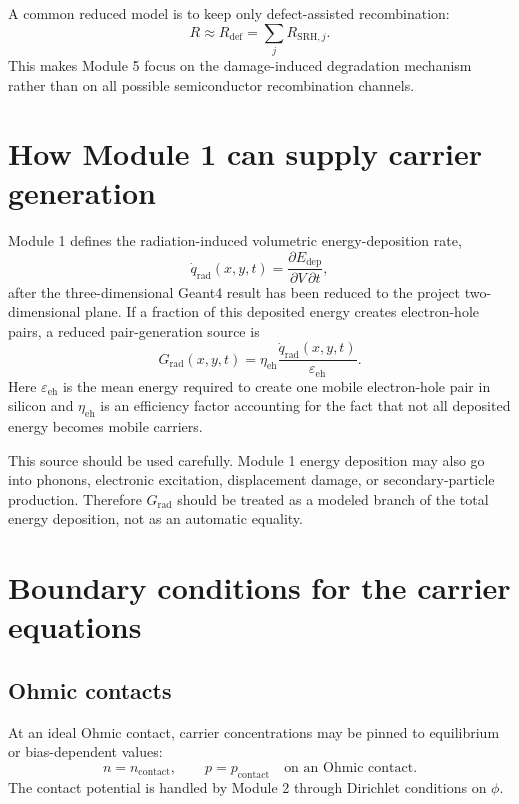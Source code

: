 \documentclass[11pt]{article}
\begin{document}
A common reduced model is to keep only defect-assisted recombination:
\begin{equation}
R\approx R_{\mathrm{def}}=\sum_j R_{\mathrm{SRH},j}.
\end{equation}
This makes Module 5 focus on the damage-induced degradation mechanism rather than on all possible semiconductor recombination channels.

\section{How Module 1 can supply carrier generation}

Module 1 defines the radiation-induced volumetric energy-deposition rate,
\begin{equation}
\dot{q}_{\mathrm{rad}}(x,y,t)=\frac{\partial E_{\mathrm{dep}}}{\partial V\,\partial t},
\end{equation}
after the three-dimensional Geant4 result has been reduced to the project two-dimensional plane. If a fraction of this deposited energy creates electron-hole pairs, a reduced pair-generation source is
\begin{equation}
\boxed{G_{\mathrm{rad}}(x,y,t)=\eta_{\mathrm{eh}}\frac{\dot{q}_{\mathrm{rad}}(x,y,t)}{\varepsilon_{\mathrm{eh}}}.}
\end{equation}
Here \(\varepsilon_{\mathrm{eh}}\) is the mean energy required to create one mobile electron-hole pair in silicon and \(\eta_{\mathrm{eh}}\) is an efficiency factor accounting for the fact that not all deposited energy becomes mobile carriers.

This source should be used carefully. Module 1 energy deposition may also go into phonons, electronic excitation, displacement damage, or secondary-particle production. Therefore \(G_{\mathrm{rad}}\) should be treated as a modeled branch of the total energy deposition, not as an automatic equality.

\section{Boundary conditions for the carrier equations}

\subsection{Ohmic contacts}

At an ideal Ohmic contact, carrier concentrations may be pinned to equilibrium or bias-dependent values:
\begin{equation}
 n=n_{\mathrm{contact}},\qquad p=p_{\mathrm{contact}} \quad \text{on an Ohmic contact}.
\end{equation}
The contact potential is handled by Module 2 through Dirichlet conditions on \(\phi\).
\end{document}
